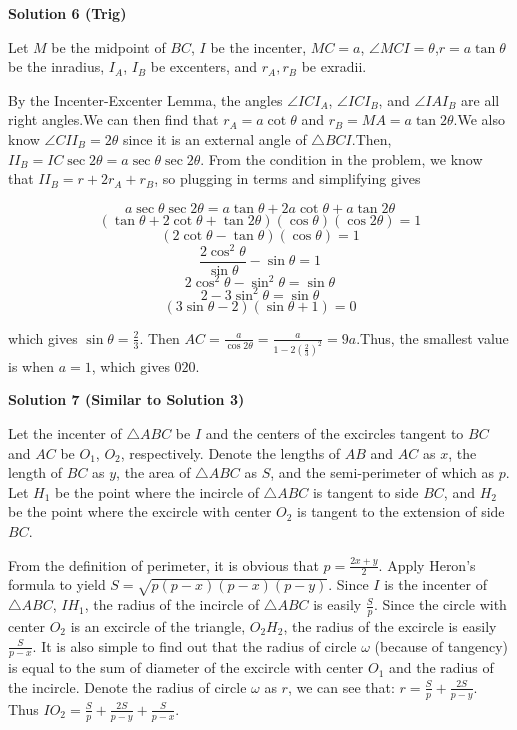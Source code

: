 \begin{enumerate}
 



\textbf{Solution 6 (Trig)}

Let $M$ be the midpoint of $BC$, $I$ be the incenter, $MC = a$, $\angle MCI = \theta$,$r = a\tan{\theta}$ be the inradius, $I_A$, $I_B$ be excenters, and $r_A, r_B$ be exradii.

 By the Incenter-Excenter Lemma, the angles $\angle ICI_A$, $\angle ICI_B$, and $\angle IAI_B$ are all right angles.We can then find that $r_A = a\cot{\theta}$ and $r_B = MA = a\tan{2\theta}$.We also know $\angle CII_B = 2\theta$ since it is an external angle of $\triangle BCI$.Then, $II_B = IC\sec{2\theta} = a\sec{\theta}\sec{2\theta}$. From the condition in the problem, we know that $II_B = r+2r_A+r_B$, so plugging in terms and simplifying gives

 
 \[a\sec{\theta}\sec{2\theta} = a\tan{\theta}+2a\cot{\theta}+a\tan{2\theta}\]
 \[(\tan{\theta}+2\cot{\theta}+\tan{2\theta})(\cos{\theta})(\cos{2\theta})=1\]
 \[(2\cot{\theta}-\tan{\theta})(\cos{\theta})=1\]
 \[\frac{2\cos^2{\theta}}{\sin{\theta}}-\sin{\theta}=1\]
 \[2\cos^2{\theta}-\sin^2{\theta}=\sin{\theta}\]
 \[2-3\sin^2{\theta}=\sin{\theta}\]
 \[(3\sin{\theta}-2)(\sin{\theta}+1)=0\]

 which gives $\sin{\theta}=\frac{2}{3}$. Then $AC = \frac{a}{\cos{2\theta}} = \frac{a}{1-2(\frac{2}{3})^2} = 9a$.Thus, the smallest value is when $a=1$, which gives $\boxed{020}$.

 



\textbf{Solution 7 (Similar to Solution 3)}

Let the incenter of $\triangle ABC$ be $I$ and the centers of the excircles tangent to $BC$ and $AC$ be $O_1$, $O_2$, respectively. Denote the lengths of $AB$ and $AC$ as $x$, the length of $BC$ as $y$, the area of $\triangle ABC$ as $S$, and the semi-perimeter of which as $p$. Let $H_1$ be the point where the incircle of $\triangle ABC$ is tangent to side $BC$, and $H_2$ be the point where the excircle with center $O_2$ is tangent to the extension of side $BC$.

 From the definition of perimeter, it is obvious that $p=\frac{2x+y}{2}$. Apply Heron's formula to yield $S=\sqrt{p(p-x)(p-x)(p-y)}$. Since $I$ is the incenter of $\triangle ABC$, $IH_1$, the radius of the incircle of $\triangle ABC$ is easily $\frac{S}{p}$. Since the circle with center $O_2$ is an excircle of the triangle, $O_2H_2$, the radius of the excircle is easily $\frac{S}{p-x}$. It is also simple to find out that the radius of circle $\omega$ (because of tangency) is equal to the sum of diameter of the excircle with center $O_1$ and the radius of the incircle. Denote the radius of circle $\omega$ as $r$, we can see that: $r=\frac{S}{p}+\frac{2S}{p-y}$. Thus $IO_2=\frac{S}{p}+\frac{2S}{p-y}+\frac{S}{p-x}$.


\end{enumerate}
